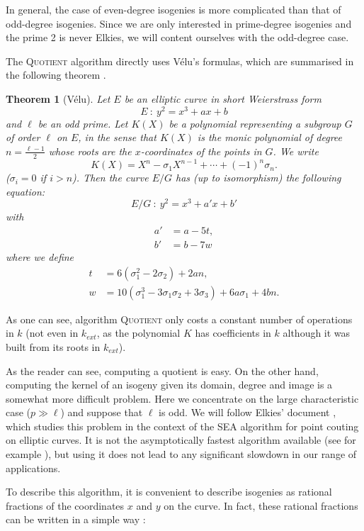\documentclass{article}
\newcommand{\algstyle}[1]{\textsc{#1}}
\renewcommand{\v}{\vspace{5mm}}
\newtheorem{theorem}{Theorem}[section]
\theoremstyle{definition}
\begin{document}
In general, the case of even-degree isogenies is
more complicated than that of odd-degree isogenies. Since we are only
interested in prime-degree isogenies and the prime 2 is never Elkies, we
will content ourselves with the odd-degree case.

The \algstyle{Quotient} algorithm directly uses Vélu's formulas, which are
summarised in the following theorem \cite{}.
\begin{theorem}[Vélu]
Let $E$ be an elliptic curve in short Weierstrass form
\[
E\ :\ y^2 = x^3 + a x + b
\]
and $\ell$ be an odd prime. Let $K(X)$ be a polynomial representing a subgroup $G$
of order $\ell$ on $E$, in the sense that $K(X)$ is the monic polynomial of degree
$n = \frac{\ell - 1}{2}$ whose roots are the $x$-coordinates of the points in $G$.
We write
\[
K(X) = X^n - \sigma_1 X^{n-1} + \cdots + (-1)^n \sigma_n.
\]
($\sigma_i = 0$ if $i>n$).
Then the curve $E/G$ has (up to isomorphism) the following equation:
\[
E/G\ :\ y^2 = x^3 + a' x + b'
\]
with
\[
\begin{aligned}
a' &= a - 5t,\\
b' &= b - 7w
\end{aligned}
\]
where we define
\[
\begin{aligned}
t &= 6 (\sigma_1^2 - 2\sigma_2) + 2 a n,\\
w &= 10 (\sigma_1^3 - 3 \sigma_1\sigma_2 + 3\sigma_3) + 6 a\sigma_1 + 4bn.
\end{aligned}
\]


\end{theorem}

As one can see, algorithm \algstyle{Quotient} only costs a constant number
of operations in $k$ (not even in $k_{ext}$, as the polynomial $K$ has
coefficients in $k$ although it was built from its roots in $k_{ext}$).
\v

As the reader can see, computing a quotient is easy. On the other hand,
computing the kernel of an isogeny given its domain, degree and image is a
somewhat more difficult problem. Here we concentrate on the large
characteristic case ($p\gg\ell$) and suppose that $\ell$ is odd.
We will follow Elkies' document \cite{}, which studies
this problem in the context of the SEA algorithm for point couting on
elliptic curves. It is not the asymptotically fastest algorithm available
(see for example \cite{}),
but using it does not lead to any significant slowdown in our range of applications.

To describe this algorithm, it is convenient to describe isogenies as
rational fractions of the coordinates $x$ and $y$ on the curve. In fact, these
rational fractions can be written in a simple way \cite{}:
\end{document}
